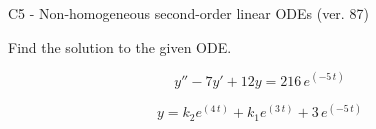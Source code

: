 \begin{exercise}
  \begin{exerciseTitle}C5 - Non-homogeneous second-order linear ODEs (ver. 87)\end{exerciseTitle}
  \begin{exerciseStatement}
    
Find the solution to the given ODE.

    
\[y''-7y'+12y = 216 \, e^{\left(-5 \, t\right)}\]

  \end{exerciseStatement}
  \begin{exerciseAnswer}
    
\[y= k_{2} e^{\left(4 \, t\right)} + k_{1} e^{\left(3 \, t\right)} + 3 \, e^{\left(-5 \, t\right)}\]

  \end{exerciseAnswer}
\end{exercise}